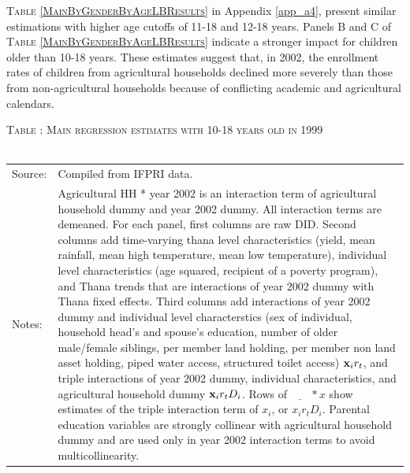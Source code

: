 \documentclass[12pt,letterpaper]{article}
\newcommand{\bfx}{\ensuremath{\mbox{\bf x}}}
\newcommand{\0}{\ensuremath{\mbox{\boldmath $0$}}}
\begin{document}
\textsc{\small Table \ref{MainByGenderByAgeLBResults}} in Appendix \ref{app_a4}, present similar estimations with higher age cutoffs of 11-18 and 12-18 years. Panels B and C of \textsc{Table \ref{MainByGenderByAgeLBResults}} indicate a stronger impact for children older than 10-18 years. These estimates suggest that, in 2002, the enrollment rates of children from agricultural households declined more severely than those from non-agricultural households because of conflicting academic and agricultural calendars.


\begin{table}\hfil\textsc{\footnotesize Table \thetable: Main regression estimates with 10-18 years old in 1999\label{base10}}\\\setlength{\tabcolsep}{.5pt}\renewcommand{\arraystretch}{.675}\hspace{-2em}\hfil\\\renewcommand{\arraystretch}{1}\hfil\begin{tabular}{>{\hfill\scriptsize}p{1cm}<{}>{\scriptsize}p{12cm}<{\hfill}} Source:& Compiled from IFPRI data. \\[-1ex] Notes:&   \textsf{Agricultural HH * year 2002} is an interaction term of agricultural household dummy and year 2002 dummy. All interaction terms are demeaned. For each panel, first columns are raw DID. Second columns add time-varying thana level characteristics (yield, mean rainfall, mean high temperature, mean low temperature), individual level characteristics (age squared, recipient of a poverty program), and \textsf{Thana trends} that are interactions of year 2002 dummy with Thana fixed effects. Third columns add interactions of year 2002 dummy and individual level characterstics (sex of individual, household head's and spouse's education, number of older male/female siblings, per member land holding, per member non land asset holding, piped water access, structured toilet access) $\bfx_{i}r_{t}$, and triple interactions of year 2002 dummy, individual characteristics, and agricultural household dummy $\bfx_{i}r_{t}D_{i}$. Rows of $\underline{\phantom{mm}}*x$ show estimates of the triple interaction term of $x_{i}$, or $x_{i}r_{t}D_{i}$. Parental education variables are strongly collinear with agricultural household dummy and are used only in year 2002 interaction terms to avoid multicollinearity.  \end{tabular} \end{table}
\end{document}
